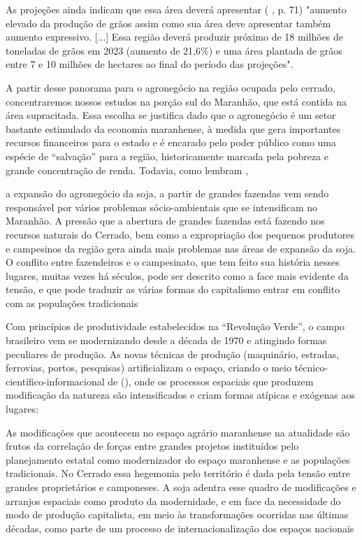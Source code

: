 As projeções ainda indicam que essa área deverá apresentar (\citeauthor{brministerioAgricultura2013} \citeyear{brministerioAgricultura2013}, p. 71) "aumento elevado da produção de grãos assim como sua área deve apresentar também aumento expressivo. [...] Essa região deverá produzir próximo de 18 milhões de toneladas de grãos em 2023 (aumento de 21,6\%) e uma área plantada de grãos entre 7 e 10 milhões de hectares ao final do período das projeções".

A partir desse panorama para o agronegócio na região ocupada pelo cerrado, concentraremos nossos estudos na porção sul do Maranhão, que está contida na área supracitada. Essa escolha se justifica dado que o agronegócio é um setor bastante estimulado da economia maranhense, à medida que gera importantes recursos financeiros para o estado e é encarado pelo poder público como uma espécie de “salvação” para a região, historicamente marcada pela pobreza e grande concentração de renda. Todavia, como lembram ,

\begin{citacao}
a expansão do agronegócio da soja, a partir de grandes fazendas vem sendo responsável por vários problemas sócio-ambientais que se intensificam no Maranhão. A pressão que a abertura de grandes fazendas está fazendo nos recursos naturais do Cerrado, bem como a expropriação dos pequenos produtores e campesinos da região gera ainda mais problemas nas áreas de expansão da soja. O conflito entre fazendeiros e o campesinato, que tem feito sua história nesses lugares, muitas vezes há séculos, pode ser descrito como a face mais evidente da tensão, e que pode traduzir as várias formas do capitalismo entrar em conflito com as populações tradicionais \cite[p. 1]{rodrigues_alencar}
\end{citacao}

Com princípios de produtividade estabelecidos na “Revolução Verde”, o campo brasileiro vem se modernizando desde a década de 1970 e atingindo formas peculiares de produção. As novas técnicas de produção (maquinário, estradas, ferrovias, portos, pesquisas) artificializam o espaço, criando o meio técnico-científico-informacional de  (\citeyear{santos1996}), onde os processos espaciais que produzem modificação da natureza são intensificados e criam formas atípicas e exógenas aos lugares:

\begin{citacao}
As modificações que acontecem no espaço agrário maranhense na atualidade são frutos da correlação de forças entre grandes projetos instituídos pelo planejamento estatal como modernizador do espaço maranhense e as populações tradicionais. No Cerrado essa hegemonia pelo território é dada pela tensão entre grandes proprietários e camponeses. A soja adentra esse quadro de modificações e arranjos espaciais como produto da 
modernidade, e em face da necessidade do modo de produção capitalista, em meio às transformações ocorridas nas últimas décadas, como parte de um processo de internacionalização dos espaços nacionais  \cite[p. 3]{rodrigues_alencar}
\end{citacao}

